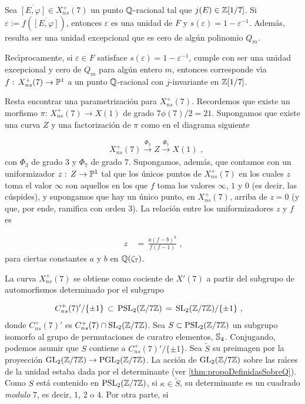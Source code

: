\begin{lemaUnoKenku}\label{thm:lemaUnoKenku}
Sea $\overline{[E,\varphi]}\in X_{ns}^{+}(7)$ un punto $\mathbb{Q}$-racional
tal que $j(E)\in\mathbb{Z}[1/7]$. Si $\varepsilon:=f(\overline{[E,\varphi]})$,
entonces $\varepsilon$ es una unidad de $F$ y
$s(\varepsilon)=1-\varepsilon^{-1}$. Adem\'{a}s, resulta ser una
unidad excepcional que es cero de alg\'{u}n polinomio $Q_{m}$.

Rec\'{\i}procamente, si $\varepsilon\in F$ satisface
$s(\varepsilon)=1-\varepsilon^{-1}$, cumple con ser una unidad excepcional
y cero de $Q_{m}$ para alg\'{u}n entero $m$, entonces corresponde v\'{\i}a
$f:\,X_{ns}^{+}(7)\rightarrow\mathbb{P}^{1}$ a un punto $\mathbb{Q}$-racional con
$j$-invariante en $\mathbb{Z}[1/7]$.

\end{lemaUnoKenku}

Resta encontrar una parametrizaci\'{o}n para $X_{ns}^{+}(7)$.
Recordemos que existe un morfismo $\pi:\,X_{ns}^{+}(7)\rightarrow X(1)$
de grado $7\phi(7)/2=21$. Supongamos que existe una curva $Z$ y una
factorizaci\'{o}n de $\pi$ como en el diagrama siguiente

\begin{align*}
& X_{ns}^{+}(7)\xrightarrow{\Phi_{3}}
Z\xrightarrow{\Phi_{7}} X(1)\text{ ,}
\end{align*}
con $\Phi_{3}$ de grado $3$ y $\Phi_{7}$ de grado $7$. Supongamos,
adem\'{a}s, que contamos con un uniformizador $z:\,Z\rightarrow\mathbb{P}^{1}$
tal que los \'{u}nicos puntos de $X_{ns}^{+}(7)$ en los cuales $z$ toma el
valor $\infty$ son aquellos en los que $f$ toma los valores $\infty$, $1$
y $0$ (es decir, las c\'{u}spides), y supongamos que hay un \'{u}nico
punto, en $X_{ns}^{+}(7)$, arriba de $z=0$ (y que, por ende, ramifica con
orden $3$). La relaci\'{o}n entre los uniformizadores $z$ y $f$ es

\begin{align*}
z &\,=\,\frac{a(f-b)^{3}}{f(f-1)}\text{ ,}
\end{align*}
para ciertas constantes $a$ y $b$ en $\mathbb{Q}(\zeta_{7})$.

La curva $X_{ns}^{+}(7)$ se obtiene como cociente de $X'(7)$ a partir del
subgrupo de automorfismos determinado por el subgrupo

\begin{align*}
C_{ns}^{+}(7)'/\{\pm 1\} & \,\subset\,\mathrm{PSL}_{2}(\mathbb{Z}/7\mathbb{Z})
\,=\,\mathrm{SL}_{2}(\mathbb{Z}/7\mathbb{Z})/\{\pm 1\}
\text{ ,}
\end{align*}
donde $C_{ns}^{+}(7)'$ es $C_{ns}^{+}(7)\cap\mathrm{SL}_{2}(\mathbb{Z}/7\mathbb{Z})$.
Sea $S\subset\mathrm{PSL}_{2}(\mathbb{Z}/7\mathbb{Z})$ un subgrupo isomorfo al
grupo de permutaciones de curatro elementos, $\mathbb{S}_{4}$.
Conjugando, podemos asumir que $S$ contiene a $C_{ns}^{+}(7)'/\{\pm 1\}$.
Sea $\widetilde{S}$ su preimagen por la proyecci\'{o}n
$\mathrm{GL}_{2}(\mathbb{Z}/7\mathbb{Z})\rightarrow\mathrm{PGL}_{2}(\mathbb{Z}/7\mathbb{Z})$.
La acci\'{o}n de $\mathrm{GL}_{2}(\mathbb{Z}/7\mathbb{Z})$ sobre las ra\'{\i}ces de la unidad
estaba dada por el determinante (ver \ref{thm:propoDefinidasSobreQ}).
Como $S$ est\'{a} contenido en $\mathrm{PSL}_{2}(\mathbb{Z}/7\mathbb{Z})$, si
$\kappa\in\widetilde{S}$, su determinante es un cuadrado \textit{modulo}
$7$, es decir, $1$, $2$ o $4$. Por otra parte, si

